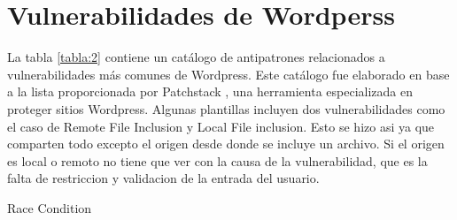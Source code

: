 \chapter{Vulnerabilidades de Wordperss}

La tabla \ref{tabla:2} contiene un catálogo de antipatrones relacionados a vulnerabilidades más comunes de Wordpress. Este catálogo fue elaborado en base a la lista proporcionada por Patchstack\cite{Patchstack} , una herramienta especializada en proteger sitios Wordpress. Algunas plantillas incluyen dos vulnerabilidades como el caso de Remote File Inclusion y Local File inclusion. Esto se hizo asi ya que comparten todo excepto el origen desde donde se incluye un archivo. Si el origen es local o remoto no tiene que ver con la causa de la vulnerabilidad, que es la falta de restriccion y validacion de la entrada del usuario.

Race Condition


\newpage

